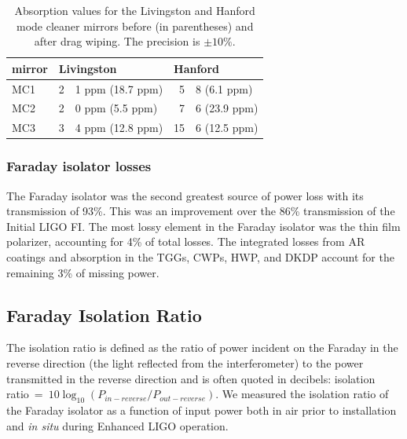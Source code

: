 \begin{table}
\centering
\caption[Absorption values for the Livingston and Hanford mode
cleaner mirrors]{Absorption values for the Livingston and Hanford mode
  cleaner mirrors before (in parentheses) and after drag wiping. The precision is $\pm 10\%$.} 
\begin{tabular}{l r@{.}l r@{.}l}
\hline
mirror & \multicolumn{2}{l}{Livingston} & \multicolumn{2}{l}{Hanford}\\
\hline
MC1 & 2&1 ppm (18.7 ppm) & 5&8 (6.1 ppm) \\
MC2 & 2&0 ppm (5.5 ppm) & 7&6 (23.9 ppm) \\
MC3 & 3&4 ppm (12.8 ppm) & 15&6 (12.5 ppm) \\
\hline
\end{tabular}
\label{tab:MCabsorption2}
\end{table}


\subsubsection{Faraday isolator losses} 
The Faraday isolator was the second greatest source of power loss with
its transmission of 93\%. This was an improvement over the
86\% transmission of the Initial LIGO FI. The most lossy element in the
Faraday isolator was the thin film polarizer, accounting for 4\% of
total losses. The integrated losses from AR coatings and absorption in the
TGGs, CWPs, HWP, and DKDP account for the remaining 3\% of missing power. 


\subsection{Faraday Isolation Ratio}
The isolation ratio is defined as the ratio of power incident on the
Faraday in the reverse direction (the light reflected from the
interferometer) to the power transmitted in the 
reverse direction and is often quoted in decibels: isolation ratio~=~$10
\log_{10}(P_{in-reverse}/P_{out-reverse})$.  We measured the isolation ratio of the
Faraday isolator as a function of input power both in air prior to
installation and \emph{in situ} during Enhanced LIGO operation.

